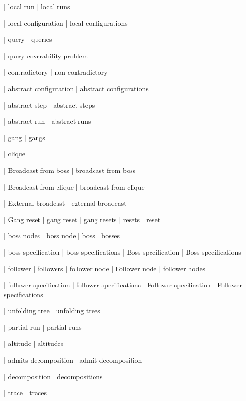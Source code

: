 | local run
| local runs

| local configuration
| local configurations

| query
| queries

| query coverability problem

| contradictory
| non-contradictory

| abstract configuration
| abstract configurations

| abstract step
| abstract steps


| abstract run
| abstract runs


| gang
| gangs

| clique

| Broadcast from boss
| broadcast from boss

| Broadcast from clique
| broadcast from clique

| External broadcast
| external broadcast

| Gang reset
| gang reset
| gang resets
| resets
| reset


| boss nodes
| boss node
| boss
| bosses

| boss specification
| boss specifications
| Boss specification
| Boss specifications


| follower
| followers
| follower node
| Follower node
| follower nodes

| follower specification
| follower specifications
| Follower specification
| Follower specifications

| unfolding tree
| unfolding trees
%

| partial run
| partial runs

| altitude
| altitudes

| admits decomposition
| admit decomposition

| decomposition
| decompositions

| trace
| traces

